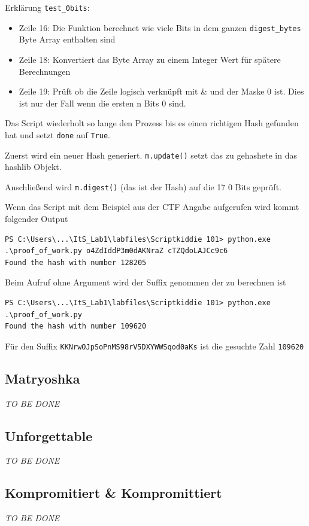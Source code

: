 \documentclass[12pt,a4paper,titlepage,oneside]{scrartcl}
\begin{document}
Erklärung \lstinline{test_0bits}:
\begin{itemize}
    \item Zeile 16: Die Funktion berechnet wie viele Bits in dem ganzen \lstinline{digest_bytes} Byte Array enthalten sind
    \item Zeile 18: Konvertiert das Byte Array zu einem Integer Wert für spätere Berechnungen
    \item Zeile 19: Prüft ob die Zeile logisch verknüpft mit \& und der Maske 0 ist. Dies ist nur der Fall wenn die ersten n Bits 0 sind.
\end{itemize}

Das Script wiederholt so lange den Prozess bis es einen richtigen Hash gefunden hat und setzt \lstinline{done} auf \lstinline{True}.

Zuerst wird ein neuer Hash generiert. \lstinline{m.update()} setzt das zu gehashete in das hashlib Objekt.

Anschließend wird \lstinline{m.digest()} (das ist der Hash) auf die 17 0 Bits geprüft.

Wenn das Script mit dem Beispiel aus der CTF Angabe aufgerufen wird kommt folgender Output

\begin{lstlisting}
PS C:\Users\...\ItS_Lab1\labfiles\Scriptkiddie 101> python.exe .\proof_of_work.py o4ZdIddP3m0dAKNraZ cTZQdoLAJCc9c6
Found the hash with number 128205
\end{lstlisting}

Beim Aufruf ohne Argument wird der Suffix genommen der zu berechnen ist

\begin{lstlisting}
PS C:\Users\...\ItS_Lab1\labfiles\Scriptkiddie 101> python.exe .\proof_of_work.py
Found the hash with number 109620
\end{lstlisting}

Für den Suffix \lstinline{KKNrwOJpSoPnMS98rV5DXYWWSqod0aKs} ist die gesuchte Zahl \lstinline{109620}

\subsection{Matryoshka}
\emph{TO BE DONE}

\subsection{Unforgettable}
\emph{TO BE DONE}

\subsection{Kompromitiert \& Kompromittiert}
\emph{TO BE DONE}
\end{document}

